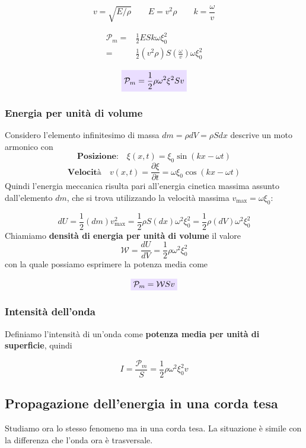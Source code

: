 \documentclass[x11names]{article}
\newcommand{\viola}[1]{\colorbox{myred}{$\displaystyle #1$}}
\begin{document}
	\[ 
	\boxed{v = \sqrt{E/\rho} \qquad E = v^2 \rho} \qquad \boxed{k = \frac{\omega}{v}}
	\]
	
	\begin{align*}
		\mathcal{P}_m =& \frac{1}{2} ESk\omega \xi_0^2  \\
			=& \frac{1}{2} (v^2 \rho)S\left(\frac{\omega}{v}\right) \omega\xi_0^2 
	\end{align*}
	
	\begin{equation}
		\viola{\mathcal{P}_m = \frac{1}{2}\rho \omega^2 \xi^2 S v}
	\end{equation}
	
	
	\subsubsection{Energia per unità di volume}
	Considero l'elemento infinitesimo di massa \(dm = \rho dV = \rho S dx\) descrive un moto armonico con 
	\[ 
	\textbf{Posizione:} \quad \xi(x,t) = \xi_0\sin\left(kx - \omega t\right) 
	\]
	\[ 
	\textbf{Velocità} \quad v(x,t)= \frac{\partial\xi}{\partial t} = \omega \xi_0\cos\left(kx - \omega t\right) 
	\]
	Quindi l'energia meccanica risulta pari all'energia cinetica massima assunto dall'elemento \(dm\), che si trova utilizzando la velocità massima \(v_{\text{max}} = \omega \xi_0\):
	
	\[ 
	dU = \frac{1}{2}(dm)v_{\text{max}}^2 = \frac{1}{2}\rho S (dx)\omega^2 \xi_0^2 = \frac{1}{2}\rho (dV)\omega^2 \xi_0^2
	\]
	Chiamiamo \textbf{densità di energia per unità di volume} il valore 
	\[
	\mathcal{W} = \frac{dU}{dV} = \frac{1}{2}\rho \omega^2\xi_0^2
	\]
	con la quale possiamo esprimere la potenza media come 
	
	\begin{equation}
		\viola{\mathcal{P}_m = \mathcal{W}S v}
	\end{equation}

	
	\subsubsection{Intensità dell'onda}
	Definiamo l'intensità di un'onda come  \textbf{potenza media per unità di superficie}, quindi
	
	\[
	I = \frac{\mathcal{P}_m}{S} = \frac{1}{2}\rho\omega^2\xi_0^2v
	\]
	
	\subsection{Propagazione dell'energia in una corda tesa}
	Studiamo ora lo stesso fenomeno ma in una corda tesa. La situazione è simile con la differenza che l'onda ora è trasversale.
	
\end{document}
